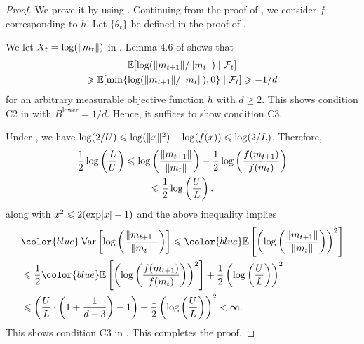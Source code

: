 \documentclass[journal]{IEEEtran}
\DeclareMathOperator{\Var}{Var}   %
\providecommand{\E}{\mathbb{E}} %
\renewcommand{\geq}{\geqslant} %
\renewcommand{\leq}{\leqslant} %
\DeclarePairedDelimiter{\norm}{\lVert}{\rVert}
\DeclarePairedDelimiter{\abs}{\lvert}{\rvert}
\theoremstyle{definition}
\begin{document}
\begin{proof}
We prove it by using . 
Continuing from the proof of , we consider $f$ corresponding to $h$. Let $\{\theta_t\}$ be defined in the proof of .

We let $X_t = \log(\norm{m_t})$ in . 
Lemma 4.6 of \cite{akimoto2020global} shows that
\begin{multline}
    \E[\log(\norm{m_{t+1}}/\norm{m_t}) \mid \mathcal{F}_t ] \\
    \geq 
    \E[\min\{ \log(\norm{m_{t+1}}/\norm{m_t}), 0 \} \mid \mathcal{F}_t ] \geq - 1/d
\end{multline}
for an arbitrary measurable objective function $h$ with $d \geq 2$. 
This shows condition C2 in  with $B^\mathrm{lower} = 1/d$. Hence, it suffices to show condition C3.

Under , we have $\log(2/U) \leq \log(\norm{x}^2) - \log(f(x)) \leq \log(2/L)$. Therefore,
\begin{multline}
    \frac{1}{2}\log\left(\frac{L}{U}\right)
    \leq
    \log\left(\frac{\norm{m_{t+1}}}{\norm{m_t}}\right)
    - \frac{1}{2} \log\left(\frac{f(m_{t+1})}{f(m_t)}\right)
    \\
    \leq
    \frac{1}{2}\log\left(\frac{U}{L}\right).
\end{multline}
 along with {$x^2 \leq 2 (\exp\abs{x} - 1)$} and the above inequality implies
\begin{equation}
\begin{aligned}[t]
&{\color{blue}\Var\left[\log\left(\frac{\norm{m_{t+1}}}{\norm{m_t}}\right)\right]}
\leq
{\color{blue}\E\left[\left(\log\left(\frac{\norm{m_{t+1}}}{\norm{m_t}}\right)\right)^2\right] }
\\
&\leq \frac{1}{2}{\color{blue}\E\left[\left(\log\left(\frac{f(m_{t+1})}{f(m_t)}\right)\right)^2\right]} + \frac{1}{2}\left(\log\left(\frac{U}{L}\right)\right)^2
\\
&\leq
\left(\frac{U}{L}\cdot\left(1+\frac{1}{d-3}\right) -1\right) + \frac{1}{2}\left(\log\left(\frac{U}{L}\right)\right)^2
<\infty
.
\end{aligned}
\end{equation}
This shows condition C3 in .
This completes the proof.
\end{proof}
\end{document}

